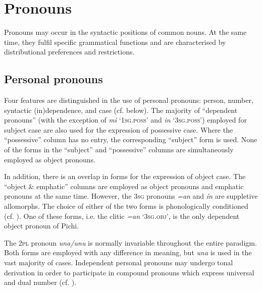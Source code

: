 \section{Pronouns}\label{sec:5.4}

Pronouns may occur in the syntactic positions of common nouns. At the same time, they fulfil specific grammatical functions and are characterised by distributional preferences and restrictions. 

\subsection{Personal pronouns}\label{sec:5.4.1}

Four features are distinguished in the use of personal pronouns: person, number, syntactic (in)dependence, and case (cf.  below). The majority of “dependent pronouns” (with the exception of \textit{mi} ‘\textsc{1sg.poss}’ and \textit{in} ‘\textsc{3sg.poss}’) employed for subject case are also used for the expression of possessive case. Where the “possessive” column has no entry, the corresponding “subject” form is used. None of the forms in the “subject” and “possessive” columns are simultaneously employed as object pronouns. 


In addition, there is an overlap in forms for the expression of object case. The “object \& emphatic” columns are employed as object pronouns and emphatic pronouns at the same time.  However, the \textsc{3sg} pronouns \textit{=an} and \textit{ín} are suppletive allomorphs. The choice of either of the two forms is phonologically conditioned (cf. ). One of these forms, i.e. the clitic \textit{=an} ‘\textsc{3sg.obj’,} is the only dependent object pronoun of Pichi. 



The \textsc{2pl} pronoun \textit{una/unu} is normally invariable throughout the entire paradigm. Both forms are employed with any difference in meaning, but \textit{una} is used in the vast majority of cases. Independent personal pronouns may undergo tonal derivation in order to participate in compound pronouns which express universal and dual number (cf. ).


